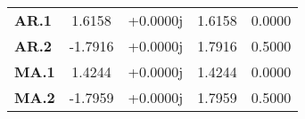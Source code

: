 \begin{center}
\begin{tabular}{lcccc}
\midrule
\textbf{AR.1} &                1.6158     &                +0.0000j     &                1.6158     &                0.0000       \\
\textbf{AR.2} &               -1.7916     &                +0.0000j     &                1.7916     &                0.5000       \\
\textbf{MA.1} &                1.4244     &                +0.0000j     &                1.4244     &                0.0000       \\
\textbf{MA.2} &               -1.7959     &                +0.0000j     &                1.7959     &                0.5000       \\
\bottomrule
\end{tabular}
\end{center}
